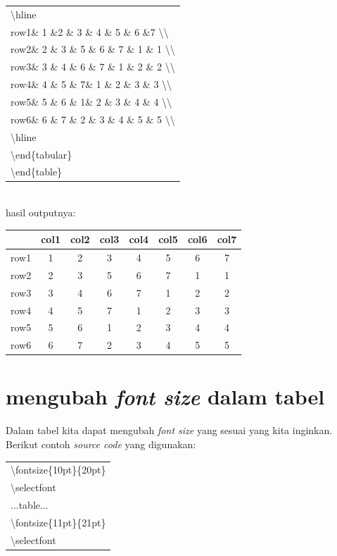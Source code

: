 \begin{enumerate}
\begin{tabular}{|p{12.5 cm}|}
 \textbackslash hline \\
row1\& 1 \&2 \& 3  \& 4 \& 5 \& 6 \&7 \textbackslash \textbackslash\\
row2\& 2 \& 3 \& 5 \& 6 \& 7 \& 1 \& 1 \textbackslash\textbackslash\\
row3\& 3 \& 4 \& 6 \& 7 \& 1 \& 2 \& 2 \textbackslash\textbackslash \\
row4\& 4 \& 5 \& 7\& 1 \& 2 \& 3 \& 3  \textbackslash\textbackslash\\
row5\& 5 \& 6 \& 1\& 2 \& 3 \& 4 \& 4  \textbackslash\textbackslash\\
row6\& 6 \& 7 \& 2 \& 3 \& 4 \& 5 \& 5  \textbackslash\textbackslash\\
\textbackslash hline\\
  \textbackslash  end\{tabular\}\\
  \textbackslash  end\{table\}\\
\hline
\end{tabular}\\[0.5 cm]
 hasil outputnya:\\
\begin{tabular}{c|g|c|g|c|g|c|g}
\hline
       &col1 &col2 &col3 &col4 & col5 &col6 &col7\\
\hline
row1& 1 &2 & 3  & 4 & 5 & 6 &7\\
row2& 2 & 3 & 5 & 6 & 7 & 1 & 1 \\
row3& 3 & 4 & 6 & 7 & 1 & 2 & 2 \\
row4& 4 & 5 & 7& 1 & 2 & 3 & 3 \\
row5& 5 & 6 & 1 & 2 & 3 & 4 & 4 \\
row6& 6 & 7 & 2 & 3 & 4 & 5 & 5 \\
\hline
\end{tabular}
\end{enumerate}
\section{mengubah {\itshape font size} dalam tabel}
Dalam tabel kita dapat mengubah {\itshape font size} yang sesuai yang kita inginkan. Berikut contoh {\itshape source code} yang digunakan: \\[0.5 cm]
\begin{tabular}{|p{13.5 cm}|}
\hline
    \textbackslash fontsize\{10pt\}\{20pt\}\\
      \textbackslash selectfont\\

    ...table...\\

      \textbackslash fontsize\{11pt\}\{21pt\}\\
      \textbackslash selectfont\\
\hline
\end{tabular}
